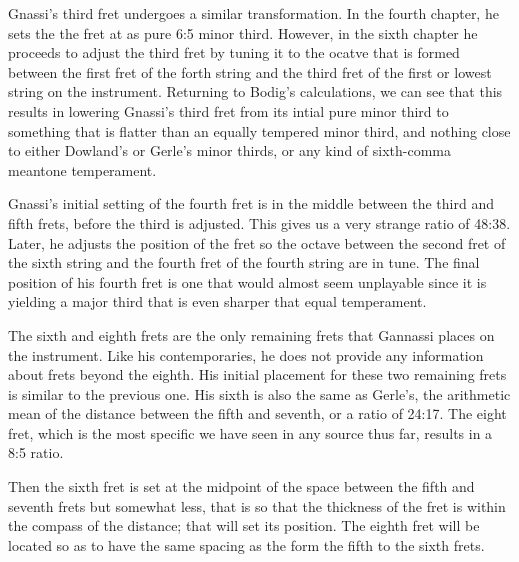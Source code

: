 

Gnassi's third fret undergoes a similar transformation.  In the fourth chapter, he sets the
the fret at as pure 6:5 minor third.  However, in the sixth chapter he proceeds to adjust the third fret
by tuning it to the ocatve that is formed between the first fret of the forth string and the
third fret of the first or lowest string on the instrument.  Returning to Bodig's calculations,
we can see that this results in lowering Gnassi's third fret from its intial pure minor third
to something that is flatter than an equally tempered minor third, and nothing close to either
Dowland's or Gerle's minor thirds, or any kind of sixth-comma meantone temperament.



Gnassi's initial setting of the fourth fret is in the middle between the third and
fifth frets, before the third is adjusted.  This gives us a very strange ratio of 48:38.  Later,
he adjusts the position of the
fret so the octave between the second fret of the sixth string and the fourth fret of the
fourth string are in tune.  The final position of his fourth fret is one that would almost
seem unplayable since it is yielding a major third that is even sharper that equal temperament.



The sixth and eighth frets are the only remaining frets that Gannassi places on the instrument.
Like his contemporaries, he does not provide any information about frets beyond the eighth.
His initial placement for these two remaining frets is similar to the previous one.  His
sixth is also the same as Gerle's, the arithmetic mean of the distance between the fifth
and seventh, or a ratio of 24:17.  The eight fret, which is the most
specific we have seen in any source thus far, results in a 8:5 ratio.

\begin{blocks}
Then the sixth fret is set at the midpoint of the space
between the fifth and seventh frets but somewhat less, that is so that the
thickness of the fret is within the compass of the distance; that will set its
position.  The eighth fret will be located so as to have the same spacing as the
form the fifth to the sixth frets.
\end{blocks}

